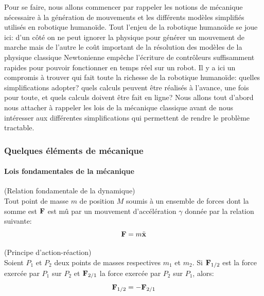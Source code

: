 Pour se faire, nous allons commencer par rappeler les notions de
mécanique nécessaire à la génération de mouvements et les différents
modèles simplifiés utilisés en robotique humanoïde. Tout l'enjeu de la
robotique humanoïde se joue ici: d'un côté on ne peut ignorer la
physique pour générer un mouvement de marche mais de l'autre le coût
important de la résolution des modèles de la physique classique
Newtonienne empêche l'écriture de contrôleurs suffisamment rapides
pour pouvoir fonctionner en temps réel sur un robot. Il y a ici un
compromis à trouver qui fait toute la richesse de la robotique
humanoïde: quelles simplifications adopter? quels calculs peuvent être
réalisés à l'avance, une fois pour toute, et quels calculs doivent
être fait en ligne? Nous allons tout d'abord nous attacher à rappeler
les lois de la mécanique classique avant de nous intéresser aux
différentes simplifications qui permettent de rendre le problème
tractable.


\subsubsection{Quelques éléments de mécanique}
\paragraph{Lois fondamentales de la mécanique}

\begin{mydef}(Relation fondamentale de la dynamique)\\
  Tout point de masse $m$ de position $M$ soumis à un ensemble de
  forces dont la somme est $\textbf{F}$ est mû par un mouvement
  d'accélération $\gamma$ donnée par la relation suivante:
  \begin{equation}\label{eq:newton}
    \textbf{F} = m \ddot{\textbf{x}}
  \end{equation}
\end{mydef}

\begin{mydef}(Principe d'action-réaction)\\
  Soient $P_1$ et $P_2$ deux points de masses respectives $m_1$ et
  $m_2$. Si $\textbf{F}_{1/2}$ est la force exercée par $P_1$ sur $P_2$ et
  $\textbf{F}_{2/1}$ la force exercée par $P_2$ sur $P_1$, alors:
  \begin{equation}\label{eq:reaction}
    \textbf{F}_{1/2} = -\textbf{F}_{2/1}
  \end{equation}
\end{mydef}

